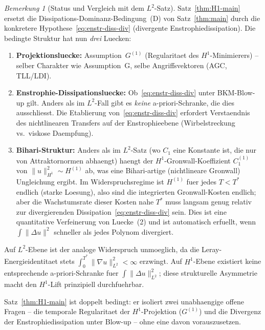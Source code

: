 \documentclass[12pt,a4paper]{article}
\theoremstyle{definition}
\theoremstyle{plain}
\theoremstyle{remark}
\newtheorem{remark}[definition]{Bemerkung}
\begin{document}
\begin{remark}[Status und Vergleich mit dem $L^2$-Satz]
\label{rem:H1-comparison}
Satz~\ref{thm:H1-main} ersetzt die Dissipations-Dominanz-Bedingung~(D) von Satz~\ref{thm:main} durch die konkretere
Hypothese~\eqref{eq:enstr-diss-div} (divergente Enstrophiedissipation).
Die bedingte Struktur hat nun \emph{drei} Luecken:
\begin{enumerate}
  \item \textbf{Projektionsluecke:}\; Assumption~$G^{(1)}$
    (Regularitaet des $H^1$-Minimierers) -- selber Charakter wie
    Assumption~G, selbe Angriffsvektoren (AGC, TLL/LDI).
  \item \textbf{Enstrophie-Dissipationsluecke:}\;
    Ob~\eqref{eq:enstr-diss-div} unter BKM-Blow-up gilt.
    Anders als im $L^2$-Fall gibt es \emph{keine} a-priori-Schranke,
    die dies ausschliesst. Die Etablierung von~\eqref{eq:enstr-diss-div}
    erfordert Verstaendnis des nichtlinearen Transfers auf der
    Enstrophieebene (Wirbelstreckung vs.\ viskose Daempfung).
  \item \textbf{Bihari-Struktur:}\;
    Anders als im $L^2$-Satz (wo $C_1$ eine Konstante ist, die nur
    von Attraktornormen abhaengt) haengt der $H^1$-Gronwall-Koeffizient
    $C_1^{(1)}$ von $\|u\|_{H^1}^2 \sim H^{(1)}$ ab, was eine
    Bihari-artige (nichtlineare Gronwall) Ungleichung ergibt.
    Im Widerspruchsregime ist $H^{(1)}$ fuer jedes $T < T^*$ endlich
    (starke Loesung), also sind die integrierten Gronwall-Kosten endlich;
    aber die Wachstumsrate dieser Kosten nahe $T^*$ muss langsam genug
    relativ zur divergierenden Dissipation~\eqref{eq:enstr-diss-div} sein.
    Dies ist eine quantitative Verfeinerung von Luecke~(2) und ist automatisch
    erfuellt, wenn $\int\|\Delta u\|^2$ schneller als jedes Polynom divergiert.
\end{enumerate}
Auf $L^2$-Ebene ist der analoge Widerspruch unmoeglich, da die
Leray-Energieidentitaet stets
$\int_0^{T^*}\|\nabla u\|_{L^2}^2 < \infty$ erzwingt.
Auf $H^1$-Ebene existiert keine entsprechende a-priori-Schranke fuer
$\int\|\Delta u\|_{L^2}^2$; diese strukturelle Asymmetrie
macht den $H^1$-Lift prinzipiell durchfuehrbar.

Satz~\ref{thm:H1-main} ist doppelt bedingt: er isoliert
zwei unabhaengige offene Fragen -- die temporale Regularitaet der
$H^1$-Projektion ($G^{(1)}$) und die Divergenz der Enstrophiedissipation
unter Blow-up -- ohne eine davon vorauszusetzen.


\end{remark}
\end{document}

